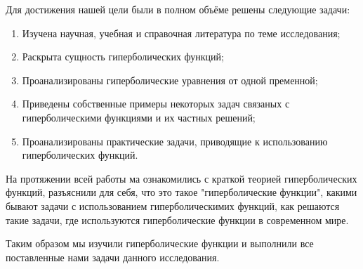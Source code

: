 \documentclass{article}
\begin{document}
Для достижения нашей цели были в полном объёме решены следующие задачи:
\begin{enumerate}
    \item Изучена научная, учебная и справочная литература по теме исследования;
    \item Раскрыта сущность гиперболических функций;
    \item Проанализированы гиперболические уравнения от одной пременной;
    \item Приведены собственные примеры некоторых задач связаных с гиперболическими функциями и их частных решений;
    \item Проанализированы практические задачи, приводящие к использованию гиперболических функций.
\end{enumerate}

На протяжении всей работы ма ознакомились с краткой теорией гиперболических функций, разъяснили для себя, что это такое "гиперболические функции", какими бывают задачи с использованием гиперболическимих функций, как решаются такие задачи, где используются гиперболические функции в современном мире.

Таким образом мы изучили гиперболические функции и выполнили все поставленные нами задачи данного исследования.
\end{document}
